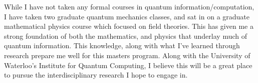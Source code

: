 \documentclass[11pt]{article}
\begin{document}
While I have not taken any formal courses in quantum information/computation, I have taken two graduate quantum mechanics classes, and sat in on a graduate mathematical physics course which focused on field theories. This has given me a strong foundation of both the mathematics, and physics that underlay much of quantum information. This knowledge, along with what I've learned through research prepare me well for this masters program. Along with the University of Waterloo's Institute for Quantum Computing, I believe this will be a great place to pursue the interdisciplinary research I hope to engage in.
\end{document}
